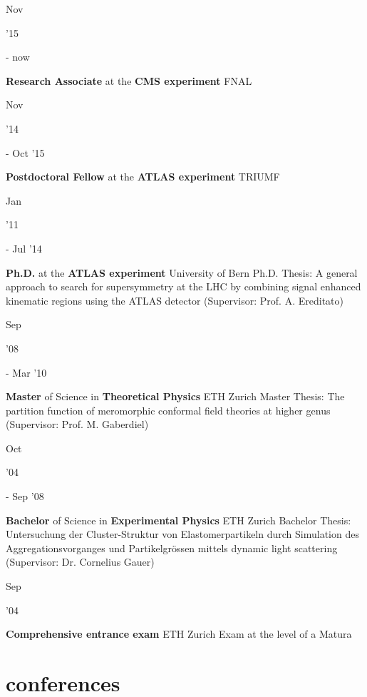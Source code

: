 \documentclass[]{cv} %
\begin{document}
\begin{entrylist}
  \entry
  {\parbox[t]{\parboxWidthOne}{Nov}\parbox[t]{\parboxWidthTwo}{\hfill '15} - now}
  {\textbf{Research Associate} at the \textbf{CMS experiment}}
  {FNAL}
  {}
  \entry
  {\parbox[t]{\parboxWidthOne}{Nov}\parbox[t]{\parboxWidthTwo}{\hfill '14} - Oct '15}
  {\textbf{Postdoctoral Fellow} at the \textbf{ATLAS experiment}}
  {TRIUMF}
  {}
  \entry
  {\parbox[t]{\parboxWidthOne}{Jan}\parbox[t]{\parboxWidthTwo}{\hfill '11} - Jul '14}
  {\textbf{Ph.D.} at the \textbf{ATLAS experiment}}
  {University of Bern}
  {Ph.D. Thesis: A general approach to search for supersymmetry at the LHC by combining signal enhanced kinematic regions using the ATLAS detector (Supervisor:
  Prof. A. Ereditato)}
  \entry
  {\parbox[t]{\parboxWidthOne}{Sep}\parbox[t]{\parboxWidthTwo}{\hfill '08} - Mar '10}
  {\textbf{Master} of Science in \textbf{Theoretical Physics}}
  {ETH Zurich}
  {Master Thesis: The partition function of meromorphic conformal field theories at higher genus (Supervisor: Prof. M. Gaberdiel)}
  \entry
  {\parbox[t]{\parboxWidthOne}{Oct}\parbox[t]{\parboxWidthTwo}{\hfill '04} - Sep '08}
  {\textbf{Bachelor} of Science in \textbf{Experimental Physics}}
  {ETH Zurich}
  {Bachelor Thesis: Untersuchung der Cluster-Struktur von Elastomerpartikeln durch Simulation des Aggregationsvorganges und Partikelgr{\"o}ssen mittels dynamic
light scattering (Supervisor: Dr. Cornelius Gauer)}
\entry
{\parbox[t]{\parboxWidthOne}{Sep}\parbox[t]{\parboxWidthTwo}{\hfill '04}}
{\textbf{Comprehensive entrance exam}}
{ETH Zurich}
{Exam at the level of a Matura}
\end{entrylist}

\section{conferences}
\end{document}
